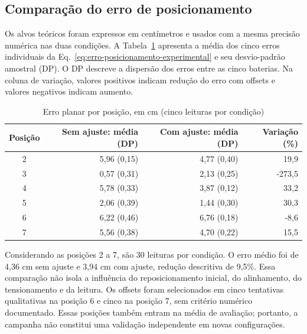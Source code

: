\subsection{Comparação do erro de posicionamento}

Os alvos teóricos foram expressos em centímetros e usados com a mesma precisão numérica nas duas condições. A Tabela~\ref{tab:erros-medidos} apresenta a média dos cinco erros individuais da Eq.~\eqref{eq:erro-posicionamento-experimental} e seu desvio-padrão amostral (DP). O DP descreve a dispersão dos erros entre as cinco baterias. Na coluna de variação, valores positivos indicam redução do erro com offsets e valores negativos indicam aumento.

\begin{table}[H]\centering\caption{Erro planar por posição, em cm (cinco leituras por condição)}\label{tab:erros-medidos}\small\begin{tabular}{crrr}\toprule Posição & Sem ajuste: média (DP) & Com ajuste: média (DP) & Variação (\%)\\\midrule

2 & 5,96 (0,15) & 4,77 (0,40) & 19,9\\

3 & 0,57 (0,31) & 2,13 (0,25) & -273,5\\

4 & 5,78 (0,33) & 3,87 (0,12) & 33,2\\

5 & 2,06 (0,39) & 1,44 (0,30) & 30,3\\

6 & 6,22 (0,46) & 6,76 (0,18) & -8,6\\

7 & 5,56 (0,38) & 4,70 (0,22) & 15,5\\

\bottomrule\end{tabular}\par{}\end{table}

Considerando as posições 2 a 7, são 30 leituras por condição. O erro médio foi de 4,36 cm sem ajuste e 3,94 cm com ajuste, redução descritiva de 9,5\%. Essa comparação não isola a influência do reposicionamento inicial, do alinhamento, do tensionamento e da leitura. Os offsets foram selecionados em cinco tentativas qualitativas na posição 6 e cinco na posição 7, sem critério numérico documentado. Essas posições também entram na média de avaliação; portanto, a campanha não constitui uma validação independente em novas configurações.

